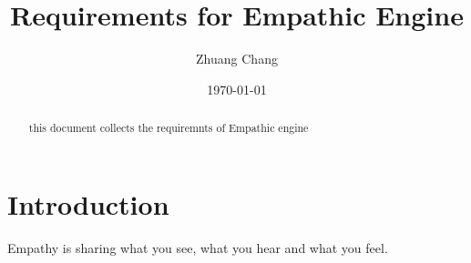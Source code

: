 \documentclass{article}
\begin{document}
\title{Requirements for Empathic Engine}
\author{Zhuang Chang}
\date{\today}
\maketitle
\begin{abstract}
this document collects the requiremnts of Empathic engine

\end{abstract}
\tableofcontents

\section{Introduction}
Empathy is sharing what you see, what you hear and what you
feel.
\end{document}
